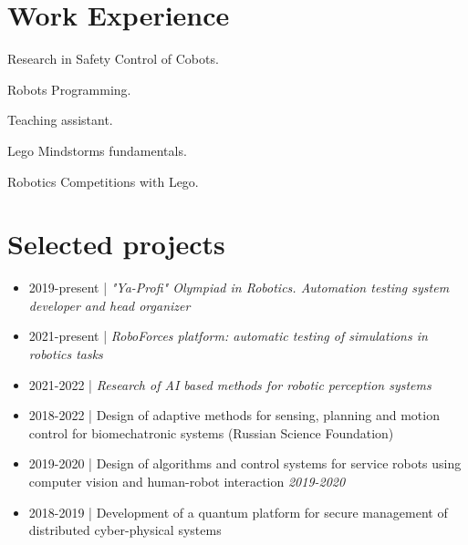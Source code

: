 \documentclass[]{deedy-resume-openfont}
\begin{document}
\begin{minipage}[t]{0.66\textwidth} 

\section{Work Experience}
\vspace{\topsep} 
\begin{tightemize}
    \item Research in Safety Control of Cobots.
    \item Robots Programming.
    \item Teaching assistant.
\end{tightemize}

\begin{tightemize}
    \item Lego Mindstorms fundamentals.
    \item Robotics Competitions with Lego. 
\end{tightemize}

\sectionsep

\vspace{-1.5em}
\section{Selected projects}

\vspace{-1em}
\begin{itemize}
    \item 2019-present | \textit{"Ya-Profi" Olympiad in Robotics. Automation testing system developer and head organizer}
    \item 2021-present | \textit{RoboForces platform: automatic testing of simulations in robotics tasks}
    \item 2021-2022 | \textit{Research of AI based methods for robotic perception systems}
    \item 2018-2022 | Design of adaptive methods for sensing, planning and motion control for biomechatronic systems (Russian Science Foundation)
    \item 2019-2020 | Design of algorithms and control systems for service robots using computer vision and human-robot interaction \textit{2019-2020}
    \item 2018-2019 | Development of a quantum platform for secure management of distributed cyber-physical systems 
\end{itemize}
\vspace{-1.5em}
\sectionsep



\end{minipage}
\end{document}
